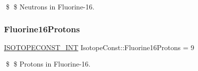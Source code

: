 \$ \$ Neutrons in Fluorine-\/16. \mbox{\label{group___isotope_const-_fluorine-_f16_ga5f7e20f61c3119018cdecf64f132d002}} 
\subsubsection{\texorpdfstring{Fluorine16\+Protons}{Fluorine16Protons}}
{\footnotesize\ttfamily \mbox{\hyperlink{group___isotope_const-_macros_ga5f18360b3e99483a35c32d789e62621c}{I\+S\+O\+T\+O\+P\+E\+C\+O\+N\+S\+T\+\_\+\+I\+NT}} Isotope\+Const\+::\+Fluorine16\+Protons = 9}

\$ \$ Protons in Fluorine-\/16. 
